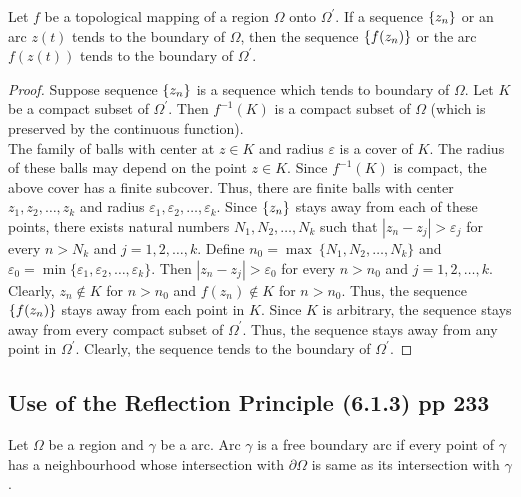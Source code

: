 \begin{theorem}
	Let $f$ be a topological mapping of a region $\Omega$ onto $\Omega^\prime$. If a sequence $\left\{z_n\right\}$ or an arc $z(t)$ tends to the boundary of $\Omega$, then the sequence $\left\{f(z_n)\right\}$ or the arc $f(z(t))$ tends to the boundary of $\Omega^\prime$.
\end{theorem}
\begin{proof}
	Suppose sequence $\left\{z_n\right\}$ is a sequence which tends to boundary of $\Omega$.
	Let $K$ be a compact subset of $\Omega^\prime$.
	Then $f^{-1}(K)$ is a compact subset of $\Omega$ (which is preserved by the continuous function).\\
	
	The family of balls with center at $z \in K$ and radius $\varepsilon$ is a cover of $K$.
	The radius of these balls may depend on the point $z \in K$.
	Since $f^{-1}(K)$ is compact, the above cover has a finite subcover.
	Thus, there are finite balls with center $z_1,z_2,\dots,z_k$ and radius $\varepsilon_1, \varepsilon_2,\dots,\varepsilon_k$.
	Since $\left\{z_n\right\}$ stays away from each of these points, there exists natural numbers $N_1,N_2,\dots,N_k$ such that $|z_n-z_j|>\varepsilon_j$ for every $n > N_k$ and $j=1,2,\dots,k$.
	Define $n_0 = \max\ \{N_1,N_2,\dots,N_k\}$ and $\varepsilon_0 = \min\{\varepsilon_1,\varepsilon_2,\dots,\varepsilon_k\}$.
	Then $|z_n-z_j| > \varepsilon_0$ for every $n > n_0$ and $j = 1,2,\dots,k$.\\

	Clearly, $z_n \notin K$ for $n > n_0$ and $f(z_n) \notin K$ for $n > n_0$.
	Thus, the sequence $\left\{f(z_n)\right\}$ stays away from each point in $K$.
	Since $K$ is arbitrary, the sequence stays away from every compact subset of $\Omega^\prime$.
	Thus, the sequence stays away from any point in $\Omega^\prime$.
	Clearly, the sequence tends to the boundary of $\Omega^\prime$.
\end{proof}

\subsection{Use of the Reflection Principle (6.1.3) pp 233}
\begin{definition}
	Let $\Omega$ be a region and $\gamma$ be a arc.
	Arc $\gamma$ is a free boundary arc if every point of $\gamma$ has a neighbourhood whose intersection with $\partial \Omega$ is same as its intersection with $\gamma$.
\end{definition}

